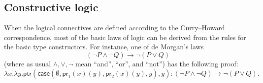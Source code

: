 \documentclass[12pt]{article}
\def\case{\mathsf{case}}
\def\proj#1{\mathsf{pr}_{#1}}
\def\types{\vdash}
\numberwithin{equation}{section}
\begin{document}
\subsection{Constructive logic}
\label{sec:constructive-logic}

When the logical connectives are defined according to the Curry--Howard correspondence, most of the basic laws of logic can be derived from the rules for the basic type constructors.
For instance, one of de Morgan's laws
\[ (\neg P \land \neg Q) \to \neg(P\lor Q) \]
(where as usual $\land,\lor,\neg$ mean ``and'', ``or'', and ``not'') has the following proof:
\[ \lambda x.\lambda y. \mathsf{ptr}(\case(\emptyset,\proj1(x)(y),\proj2(x)(y),y),y) : (\neg P \land \neg Q) \to \neg(P\lor Q). \]
\end{document}
